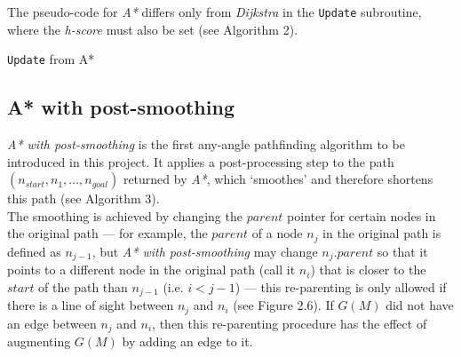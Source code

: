 \documentclass[12pt,notitlepage]{report}
\begin{document}
\noindent
The pseudo-code for {\em A*} differs only from {\em Dijkstra} in the {\tt Update} subroutine, where the {\em h-score} must also be set (see Algorithm 2).

\begin{algorithm}
  \SetAlgoLined\DontPrintSemicolon
  \caption{{\tt Update} from {\sc A*}}
\end{algorithm} 

\subsection {A* with post-smoothing}

{\em A* with post-smoothing} is the first any-angle pathfinding algorithm to be introduced in this project. It applies a post-processing step to the path $(n_{start}, n_{1}, \ldots, n_{goal})$ returned by {\em A*}, which `smoothes'  and therefore shortens this path (see Algorithm 3).\\

\noindent The smoothing is achieved by changing the $parent$ pointer for certain nodes in the original path --- for example, the $parent$ of a node $n_{j}$ in the original path is defined as $n_{j-1}$, but {\em A* with post-smoothing} may change $n_{j}.parent$ so that it points to a different node in the original path (call it $n_{i}$) that is closer to the $start$ of the path than $n_{j-1}$ (i.e. $i<j-1$) --- this re-parenting is only allowed if there is a line of sight between $n_{j}$ and $n_{i}$ (see Figure 2.6). If $G(M)$ did not have an edge between $n_{j}$ and $n_{i}$, then this re-parenting procedure has the effect of augmenting $G(M)$ by adding an edge to it.\\
\end{document}
